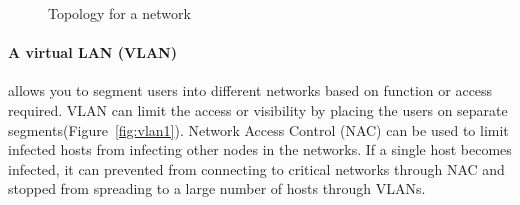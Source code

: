 \documentclass[7x9]{times}
\begin{document}
\begin{figure}[ht]
    \centering
    \hfil
    \hfil
    \caption{Topology for a network}
    \label{fig:topology}
\end{figure}

\paragraph{A virtual LAN (VLAN)} allows you to segment users
into different networks based on function or access
required. VLAN can limit the access or visibility by placing
the users on separate segments(Figure~\ref{fig:vlan1}). 
Network Access Control (NAC)
can be used to limit infected hosts from infecting other
nodes in the networks. If a single host becomes infected, it
can prevented from connecting to critical networks through
NAC and stopped from spreading to a large number of hosts
through VLANs. 
\end{document}

